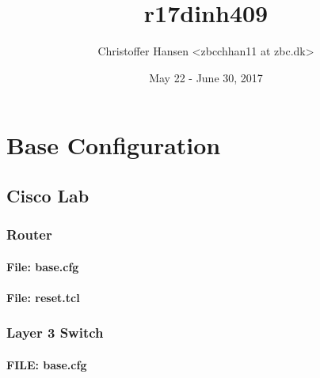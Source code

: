 \documentclass[a4paper,12pt,twoside,twocolumn]{book}
\begin{document}
\title{r17dinh409}
\author{Christoffer Hansen <zbcchhan11 at zbc.dk>}
\date{May 22 - June 30, 2017}
\maketitle

\tableofcontents


\setlength{\parskip}{0.35em}

\renewcommand{\baselinestretch}{1.15}


\chapter{Base Configuration}

\section{Cisco Lab}


\subsection{Router}
\subsubsection{File: base.cfg}
%
\subsubsection{File: reset.tcl}
%

\newpage


\subsection{Layer 3 Switch}
\subsubsection{FILE: base.cfg}

\end{document}

